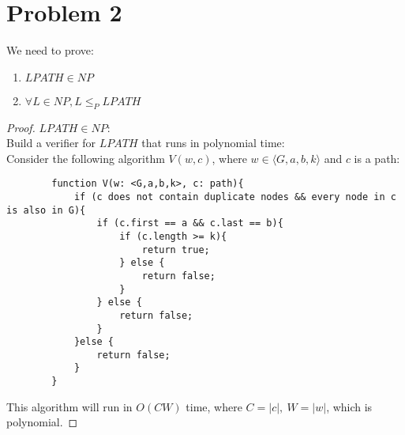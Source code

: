\documentclass[letterpaper]{article}
\begin{document}
\section*{Problem 2}
We need to prove:
\begin{enumerate}
    \item $LPATH \in NP$
    \item $\forall L \in NP, L \leq_P LPATH$
\end{enumerate}
\begin{proof}
    $LPATH \in NP$:\\
    Build a verifier for $LPATH$ that runs in polynomial time:\\
    Consider the following algorithm $V(w,c)$, where $w \in \langle G,a,b,k\rangle$ and $c$ is a path:
    \begin{verbatim}
        function V(w: <G,a,b,k>, c: path){
            if (c does not contain duplicate nodes && every node in c is also in G){
                if (c.first == a && c.last == b){
                    if (c.length >= k){
                        return true;
                    } else {
                        return false;
                    }
                } else {
                    return false;
                }
            }else {
                return false;
            }
        }
    \end{verbatim}
    This algorithm will run in $O(CW)$ time, where $C = |c|,\ W=|w|$, which is polynomial.
\end{proof}
\end{document}
